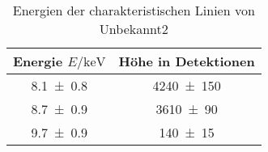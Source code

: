 
\begin{table}[H]
    \centering
    \caption{Energien der charakteristischen Linien von Unbekannt2}
    \label{tab:label}
    \begin{tabular}{c|c}
       Energie $E/\unit{\kilo\electronvolt}$ & Höhe in Detektionen \\
\hline
\num{8.1\pm 0.8} & \num{4240\pm 150} \\ 
\num{8.7\pm 0.9} & \num{3610\pm 90} \\ 
\num{9.7\pm 0.9} & \num{140\pm 15} \\ 

    \end{tabular}
\end{table}